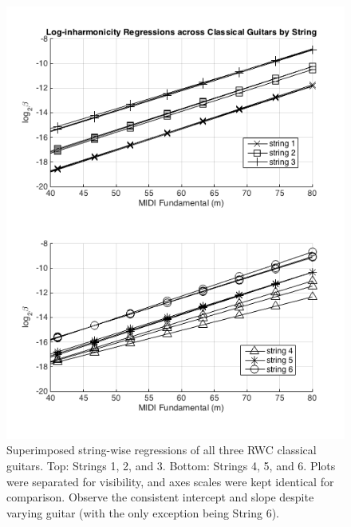 \documentclass[12pt]{cmuthesis}
\begin{document}
\begin{figure}[!htbp] 
\centering
\includegraphics[scale=0.75]{traj-compare-cg}
\caption{Superimposed string-wise regressions of all three RWC classical guitars. Top: Strings 1, 2, and 3. Bottom: Strings 4, 5, and 6. Plots were separated for visibility, and axes scales were kept identical for comparison. Observe the consistent intercept and slope despite varying guitar (with the only exception being String 6).}
\label{fig:cg-traj-comp}
\end{figure}
\end{document}
